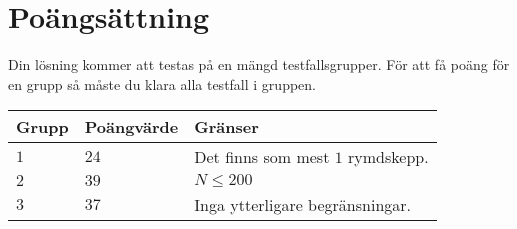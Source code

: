 \section*{Poängsättning}
Din lösning kommer att testas på en mängd testfallsgrupper.
För att få poäng för en grupp så måste du klara alla testfall i gruppen.

\noindent
\begin{tabular}{| l | l | l |}
\hline
Grupp & Poängvärde & Gränser \\ \hline
$1$   & $24$       & Det finns som mest $1$ rymdskepp. \\ \hline
$2$   & $39$       & $N \leq 200$ \\ \hline
$3$   & $37$       & Inga ytterligare begränsningar. \\ \hline
\end{tabular}

